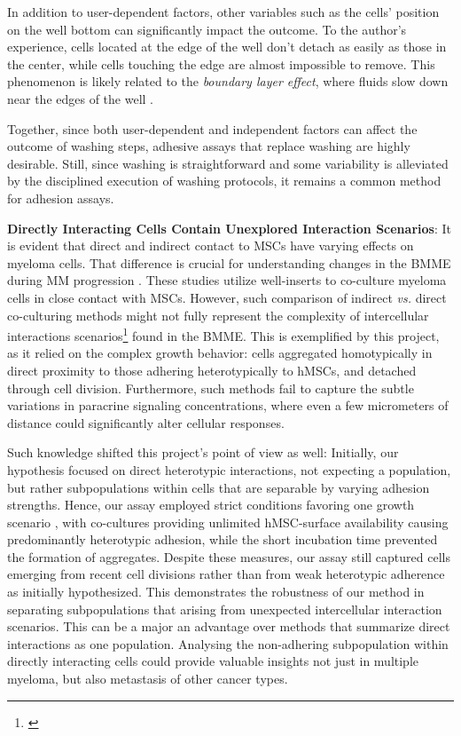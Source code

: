 In addition to user-dependent factors, other variables such as the cells'
position on the well bottom can significantly impact the outcome. To the
author's experience, cells located at the edge of the well don't detach as
easily as those in the center, while cells touching the edge are almost
impossible to remove. This phenomenon is likely related to the \textit{boundary
    layer effect}, where fluids slow down near the edges of the well
\cite{weyburneNewThicknessShape2014}.

Together, since both user-dependent and independent factors can affect the
outcome of washing steps, adhesive assays that replace washing are highly
desirable. Still, since washing is straightforward and some variability is
alleviated by the disciplined execution of washing protocols, it remains a
common method for adhesion assays.



\textbf{Directly Interacting Cells Contain Unexplored Interaction Scenarios}: It
is evident that direct and indirect contact to \acp{MSC} have varying effects on
myeloma cells. That difference is crucial for understanding changes in the
\ac{BMME} during MM progression \cite{fairfieldMultipleMyelomaCells2020,
    dziadowiczBoneMarrowStromaInduced2022}. These studies utilize well-inserts to
co-culture myeloma cells in close  contact with MSCs. However,
such comparison of indirect \textit{vs.} direct co-culturing methods might not
fully represent the complexity of intercellular interactions
scenarios\footnote{\footinteractionscenario\label{foot:interactionscenario}}
found in the \ac{BMME}. This is exemplified by this project, as it relied on the
complex growth behavior: \INA cells aggregated homotypically in direct proximity
to those adhering heterotypically to \acp{hMSC}, and detached through cell
division. Furthermore, such methods fail to capture the subtle variations in
paracrine signaling concentrations, where even a few micrometers of distance
could significantly alter cellular responses.

Such knowledge shifted this project's point of view as well: Initially, our
hypothesis focused on direct heterotypic interactions, not expecting a \nMAina
population, but rather subpopulations within \MAina cells that are separable by
varying adhesion strengths. Hence, our assay employed strict conditions favoring
one growth scenario , with co-cultures
providing unlimited hMSC-surface availability causing predominantly heterotypic
adhesion, while the short incubation time prevented the formation of aggregates.
Despite these measures, our assay still captured cells emerging from recent cell
divisions rather than from weak heterotypic adherence as initially hypothesized.
This demonstrates the robustness of our method in separating subpopulations that
arising from unexpected intercellular interaction scenarios. This can be a major
an advantage over methods that summarize direct interactions as one population.
Analysing the non-adhering subpopulation within directly interacting cells could
provide valuable insights not just in multiple myeloma, but also metastasis of
other cancer types.


